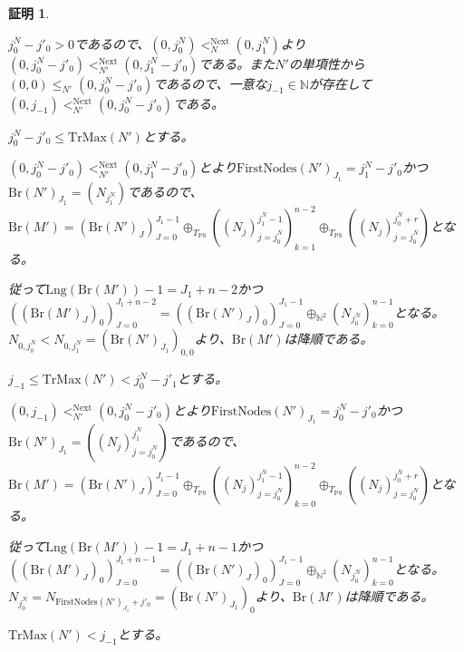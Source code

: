 \documentclass[dvipdfmx,uplatex]{jsarticle}
\theoremstyle{customnonumberbreakfortheorem}
\theoremstyle{customnonumberbreakforproof}
\newtheorem{hideableproof}{証明}
\begin{document}
\begin{hideableproof}
\begin{indented}
\begin{indented}
\begin{indented}
\begin{indented}
					\item \(j_0^N-j'_0 > 0\)であるので、\((0,j_0^N) <_N^{\textrm{Next}} (0,j_1^N)\)より\((0,j_0^N-j'_0) <_{N'}^{\textrm{Next}} (0,j_1^N-j'_0)\)である。また\(N'\)の単項性から\((0,0) \leq_{N'} (0,j_0^N-j'_0)\)であるので、一意な\(j_{-1} \in \mathbb{N}\)が存在して\((0,j_{-1}) <_{N'}^{\textrm{Next}} (0,j_0^N-j'_0)\)である。
					\item
					\item \(j_0^N-j'_0 \leq \textrm{TrMax}(N')\)とする。
					\begin{indented}
						\item \((0,j_0^N-j'_0) <_{N'}^{\textrm{Next}} (0,j_1^N-j'_0)\)とより\(\textrm{FirstNodes}(N')_{J_1} = j_1^N-j'_0\)かつ\(\textrm{Br}(N')_{J_1} = (N_{j_1^N})\)であるので、\(\textrm{Br}(M') = (\textrm{Br}(N')_J)_{J=0}^{J_1-1} \oplus_{T_{\textrm{PS}}} ((N_j)_{j=j_0^N}^{j_1^N-1})_{k=1}^{n-2} \oplus_{T_{\textrm{PS}}} ((N_j)_{j=j_0^N}^{j_0^N+r})\)となる。
						\item 従って\(\textrm{Lng}(\textrm{Br}(M'))-1 = J_1+n-2\)かつ\(((\textrm{Br}(M')_J)_0)_{J=0}^{J_1+n-2} = ((\textrm{Br}(N')_J)_0)_{J=0}^{J_1-1} \oplus_{\mathbb{N}^2} (N_{j_0^N})_{k=0}^{n-1}\)となる。\(N_{0,j_0^N} < N_{0,j_1^N} = (\textrm{Br}(N')_{J_1})_{0,0}\)より、\(\textrm{Br}(M')\)は降順である。
					\end{indented}
					\item
					\item \(j_{-1} \leq \textrm{TrMax}(N') < j_0^N-j'_1\)とする。
					\begin{indented}
						\item \((0,j_{-1}) <_{N'}^{\textrm{Next}} (0,j_0^N-j'_0)\)とより\(\textrm{FirstNodes}(N')_{J_1} = j_0^N-j'_0\)かつ\(\textrm{Br}(N')_{J_1} = ((N_j)_{j=j_0^N}^{j_1^N})\)であるので、\(\textrm{Br}(M') = (\textrm{Br}(N')_J)_{J=0}^{J_1-1} \oplus_{T_{\textrm{PS}}} ((N_j)_{j=j_0^N}^{j_1^N-1})_{k=0}^{n-2} \oplus_{T_{\textrm{PS}}} ((N_j)_{j=j_0^N}^{j_0^N+r})\)となる。
						\item 従って\(\textrm{Lng}(\textrm{Br}(M'))-1 = J_1+n-1\)かつ\(((\textrm{Br}(M')_J)_0)_{J=0}^{J_1+n-1} = ((\textrm{Br}(N')_J)_0)_{J=0}^{J_1-1} \oplus_{\mathbb{N}^2} (N_{j_0^N})_{k=0}^{n-1}\)となる。\(N_{j_0^N} = N_{\textrm{FirstNodes}(N')_{J_1}+j'_0} = (\textrm{Br}(N')_{J_1})_0\)より、\(\textrm{Br}(M')\)は降順である。
					\end{indented}
					\item
					\item \(\textrm{TrMax}(N') < j_{-1}\)とする。

\end{indented}
\end{indented}
\end{indented}
\end{indented}
\end{hideableproof}
\end{document}
